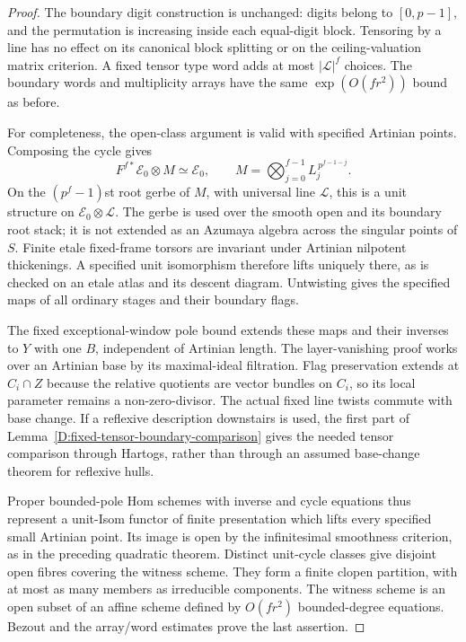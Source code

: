 \begin{proof}
The boundary digit construction is unchanged:
digits belong to $[0,p-1]$, and the permutation is
increasing inside each equal-digit block.  Tensoring
by a line has no effect on its canonical block
splitting or on the ceiling-valuation matrix
criterion.  A fixed tensor type word adds at most
$|\mathscr L|^f$ choices.  The boundary words and
multiplicity arrays have the same $\exp(O(fr^2))$
bound as before.

For completeness, the open-class argument is valid
with specified Artinian points.  Composing the cycle
gives
\[
       F^{f*}\mathcal E_0\otimes M\simeq\mathcal E_0,
       \qquad M=\bigotimes_{j=0}^{f-1}
                         L_j^{\,p^{f-1-j}}.
                                                        \tag{D.BZ.16}
\]
On the $(p^f-1)$st root gerbe of $M$, with universal
line $\mathcal L$, this is a unit structure on
$\mathcal E_0\otimes\mathcal L$.
The gerbe is used over the smooth open and its
boundary root stack; it is not extended as an
Azumaya algebra across the singular points of $S$.
Finite etale fixed-frame torsors are invariant
under Artinian nilpotent thickenings.  A specified
unit isomorphism therefore lifts uniquely there,
as is checked on an etale atlas and its descent
diagram.  Untwisting gives the specified maps of
all ordinary stages and their boundary flags.

The fixed exceptional-window pole bound extends
these maps and their inverses to $Y$ with one $B$,
independent of Artinian length.  The layer-vanishing
proof works over an Artinian base by its
maximal-ideal filtration.  Flag preservation
extends at $C_i\cap Z$ because the relative
quotients are vector bundles on $C_i$, so its
local parameter remains a non-zero-divisor.
The actual fixed line twists commute with base
change.  If a reflexive description downstairs
is used, the first part of
Lemma~\ref{D:fixed-tensor-boundary-comparison}
gives the needed tensor comparison through
Hartogs, rather than through an assumed
base-change theorem for reflexive hulls.

Proper bounded-pole Hom schemes with inverse and
cycle equations thus represent a unit-Isom functor
of finite presentation which lifts every specified
small Artinian point.  Its image is open by the
infinitesimal smoothness criterion, as in the
preceding quadratic theorem.  Distinct unit-cycle
classes give disjoint open fibres covering the
witness scheme.  They form a finite clopen
partition, with at most as many members as
irreducible components.  The witness scheme is
an open subset of an affine scheme defined by
$O(fr^2)$ bounded-degree equations.  Bezout and
the array/word estimates prove the last assertion.
\end{proof}

